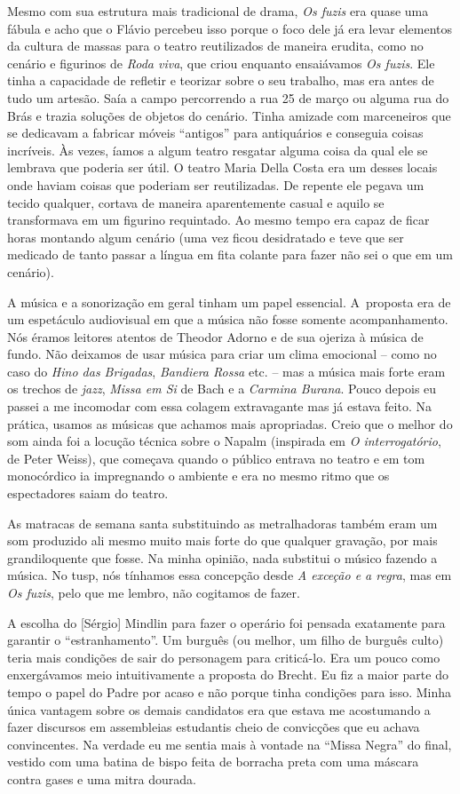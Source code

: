 Mesmo com sua estrutura mais tradicional de drama, {\it Os fuzis} era
quase uma fábula e acho que o Flávio percebeu isso porque o foco dele já
era levar elementos da cultura de massas para o teatro reutilizados de
maneira erudita, como no cenário e figurinos de {\it Roda viva}, que
criou enquanto ensaiávamos {\it Os fuzis}. Ele tinha a capacidade de
refletir e teorizar sobre o seu trabalho, mas era antes de tudo um
artesão. Saía a campo percorrendo a rua 25 de março ou alguma rua do
Brás e trazia soluções de objetos do cenário. Tinha amizade com
marceneiros que se dedicavam a fabricar móveis “antigos” para
antiquários e conseguia coisas incríveis. Às vezes, íamos a algum teatro
resgatar alguma coisa da qual ele se lembrava que poderia ser útil. O
teatro Maria Della Costa era um desses locais onde haviam coisas que
poderiam ser reutilizadas. De repente ele pegava um tecido qualquer,
cortava de maneira aparentemente casual e aquilo se transformava em um
figurino requintado. Ao mesmo tempo era capaz de ficar horas montando
algum cenário (uma vez ficou desidratado e teve que ser medicado de
tanto passar a língua em fita colante para fazer não sei o que em um
cenário).

A música e a sonorização em geral tinham um papel essencial. A~proposta
era de um espetáculo audiovisual em que a música não fosse somente
acompanhamento. Nós éramos leitores atentos de Theodor Adorno e de sua
ojeriza à música de fundo. Não deixamos de usar música para criar um
clima emocional -- como no caso do {\it Hino das Brigadas},
{\it Bandiera Rossa} etc. -- mas a música mais forte eram os trechos de
{\it jazz}, {\it Missa em Si} de Bach e a {\it Carmina Burana}. Pouco
depois eu passei a me incomodar com essa colagem extravagante mas já
estava feito. Na prática, usamos as músicas que achamos mais
apropriadas. Creio que o melhor do som ainda foi a locução técnica sobre
o Napalm (inspirada em {\it O interrogatório}, de Peter Weiss), que
começava quando o público entrava no teatro e em tom monocórdico ia
impregnando o ambiente e era no mesmo ritmo que os espectadores saiam do
teatro.

As matracas de semana santa substituindo as metralhadoras também eram um
som produzido ali mesmo muito mais forte do que qualquer gravação, por
mais grandiloquente que fosse. Na minha opinião, nada substitui o músico
fazendo a música. No {\sc tusp}, nós tínhamos essa concepção desde {\it A
exceção e a regra}, mas em {\it Os fuzis}, pelo que me lembro, não
cogitamos de fazer.

A escolha do {[}Sérgio{]} Mindlin para fazer o operário foi pensada
exatamente para garantir o “estranhamento”. Um burguês (ou melhor, um
filho de burguês culto) teria mais condições de sair do personagem para
criticá-lo. Era um pouco como enxergávamos meio intuitivamente a
proposta do Brecht. Eu fiz a maior parte do tempo o papel do Padre por
acaso e não porque tinha condições para isso. Minha única vantagem sobre
os demais candidatos era que estava me acostumando a fazer discursos em
assembleias estudantis cheio de convicções que eu achava convincentes.
Na verdade eu me sentia mais à vontade na “Missa Negra” do final,
vestido com uma batina de bispo feita de borracha preta com uma máscara
contra gases e uma mitra dourada.

